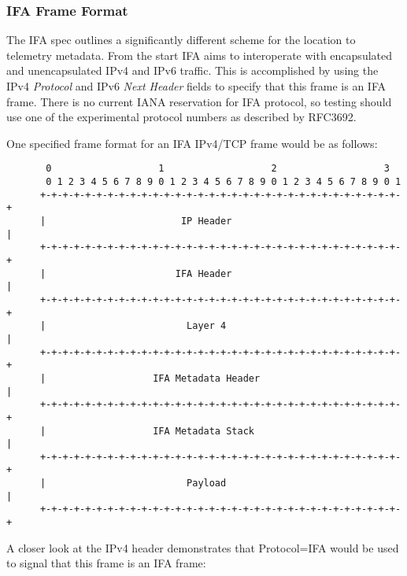 \documentclass[letterpaper,twocolumn,10pt]{article}
\begin{document}
\subsubsection{IFA Frame Format}
The IFA spec outlines a significantly different scheme for the location
to telemetry metadata.  From the start IFA aims to interoperate with
encapsulated and unencapsulated IPv4 and IPv6 traffic.  This is accomplished by
using the IPv4 \textit{Protocol} and IPv6 \textit{Next Header} fields to
specify that this frame is an IFA frame.  There is no current IANA
reservation for IFA protocol, so testing should use one of the
experimental protocol numbers as described by RFC3692\cite{RFC3692}.

One specified frame format for an IFA IPv4/TCP frame would be as follows:
\tiny
\begin{center}
\begin{verbatim}
       0                   1                   2                   3
       0 1 2 3 4 5 6 7 8 9 0 1 2 3 4 5 6 7 8 9 0 1 2 3 4 5 6 7 8 9 0 1
      +-+-+-+-+-+-+-+-+-+-+-+-+-+-+-+-+-+-+-+-+-+-+-+-+-+-+-+-+-+-+-+-+
      |                        IP Header                              |
      +-+-+-+-+-+-+-+-+-+-+-+-+-+-+-+-+-+-+-+-+-+-+-+-+-+-+-+-+-+-+-+-+
      |                       IFA Header                              |
      +-+-+-+-+-+-+-+-+-+-+-+-+-+-+-+-+-+-+-+-+-+-+-+-+-+-+-+-+-+-+-+-+
      |                         Layer 4                               |
      +-+-+-+-+-+-+-+-+-+-+-+-+-+-+-+-+-+-+-+-+-+-+-+-+-+-+-+-+-+-+-+-+
      |                   IFA Metadata Header                         |
      +-+-+-+-+-+-+-+-+-+-+-+-+-+-+-+-+-+-+-+-+-+-+-+-+-+-+-+-+-+-+-+-+
      |                   IFA Metadata Stack                          |
      +-+-+-+-+-+-+-+-+-+-+-+-+-+-+-+-+-+-+-+-+-+-+-+-+-+-+-+-+-+-+-+-+
      |                         Payload                               |
      +-+-+-+-+-+-+-+-+-+-+-+-+-+-+-+-+-+-+-+-+-+-+-+-+-+-+-+-+-+-+-+-+
\end{verbatim}
\end{center}
\normalsize

A closer look at the IPv4 header demonstrates that Protocol=IFA would be
used to signal that this frame is an IFA frame:
\end{document}
